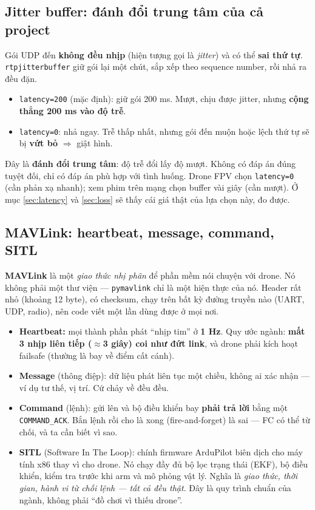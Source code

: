 \documentclass[12pt]{ai_conquer2026}
\begin{document}
\subsection{Jitter buffer: đánh đổi trung tâm của cả project}

Gói UDP đến \textbf{không đều nhịp} (hiện tượng gọi là \emph{jitter}) và có thể
\textbf{sai thứ tự}. \texttt{rtpjitterbuffer} giữ gói lại một chút, sắp xếp theo
sequence number, rồi nhả ra đều đặn.

\begin{itemize}
\item \texttt{latency=200} (mặc định): giữ gói 200 ms. Mượt, chịu được jitter,
      nhưng \textbf{cộng thẳng 200 ms vào độ trễ}.
\item \texttt{latency=0}: nhả ngay. Trễ thấp nhất, nhưng gói đến muộn hoặc lệch
      thứ tự sẽ bị \textbf{vứt bỏ} $\Rightarrow$ giật hình.
\end{itemize}

Đây là \textbf{đánh đổi trung tâm}: độ trễ đổi lấy độ mượt. Không có đáp án đúng
tuyệt đối, chỉ có đáp án phù hợp với tình huống. Drone FPV chọn \texttt{latency=0}
(cần phản xạ nhanh); xem phim trên mạng chọn buffer vài giây (cần mượt). Ở mục
\ref{sec:latency} và \ref{sec:loss} sẽ thấy cái giá thật của lựa chọn này, đo
được.

\subsection{MAVLink: heartbeat, message, command, SITL}

\textbf{MAVLink} là một \emph{giao thức nhị phân} để phần mềm nói chuyện với
drone. Nó không phải một thư viện --- \texttt{pymavlink} chỉ là một hiện thực của
nó. Header rất nhỏ (khoảng 12 byte), có checksum, chạy trên bất kỳ đường truyền
nào (UART, UDP, radio), nên code viết một lần dùng được ở mọi nơi.

\begin{itemize}
\item \textbf{Heartbeat:} mọi thành phần phát ``nhịp tim'' ở \textbf{1 Hz}. Quy
      ước ngành: \textbf{mất 3 nhịp liên tiếp ($\approx$3 giây) coi như đứt
      link}, và drone phải kích hoạt failsafe (thường là bay về điểm cất cánh).
\item \textbf{Message} (thông điệp): dữ liệu phát liên tục một chiều, không ai
      xác nhận --- ví dụ tư thế, vị trí. Cứ chảy về đều đều.
\item \textbf{Command} (lệnh): gửi lên và bộ điều khiển bay \textbf{phải trả lời}
      bằng một \texttt{COMMAND\_ACK}. Bắn lệnh rồi cho là xong (fire-and-forget)
      là sai --- FC có thể từ chối, và ta cần biết vì sao.
\item \textbf{SITL} (Software In The Loop): chính firmware ArduPilot biên dịch cho
      máy tính x86 thay vì cho drone. Nó chạy đầy đủ bộ lọc trạng thái (EKF), bộ
      điều khiển, kiểm tra trước khi arm và mô phỏng vật lý. Nghĩa là
      \emph{giao thức, thời gian, hành vi từ chối lệnh --- tất cả đều thật}. Đây
      là quy trình chuẩn của ngành, không phải ``đồ chơi vì thiếu drone''.
\end{itemize}
\end{document}

